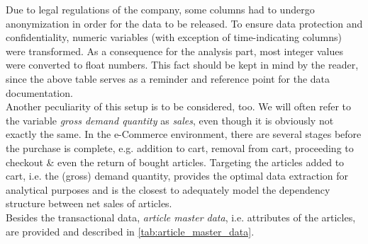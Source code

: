 Due to legal regulations of the company, some columns had to undergo anonymization in order for the data to be released. To ensure data protection and confidentiality, numeric variables (with exception of time-indicating columns) were transformed. As a consequence for the analysis part, most integer values were converted to float numbers. This fact should be kept in mind by the reader, since the above table serves as a reminder and reference point for the data documentation.\\

Another peculiarity of this setup is to be considered, too. We will often refer to the variable \textit{gross demand quantity} as \textit{sales}, even though it is obviously not exactly the same. In the e-Commerce environment, there are several stages before the purchase is complete, e.g. addition to cart, removal from cart, proceeding to checkout \& even the return of bought articles. Targeting the articles added to cart, i.e. the (gross) demand quantity, provides the optimal data extraction for analytical purposes and is the closest to adequately model the dependency structure between net sales of articles.\\

Besides the transactional data, \textit{article master data}, i.e. attributes of the articles, are provided and described in \autoref{tab:article_master_data}.

